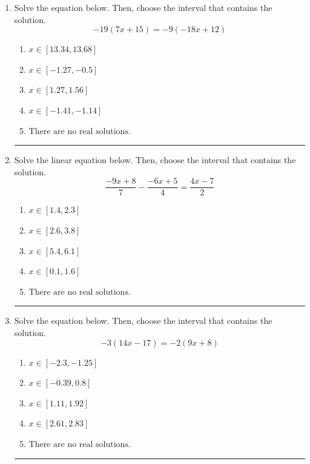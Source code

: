\documentclass[14pt]{extbook}
\newcommand{\litem}[1]{\item#1\hspace*{-1cm}\rule{\textwidth}{0.4pt}}
\begin{document}
\begin{enumerate}
\litem{
Solve the equation below. Then, choose the interval that contains the solution.\[ -19(7x + 15) = -9(-18x + 12) \]\begin{enumerate}[label=\Alph*.]
\item \( x \in [13.34, 13.68] \)
\item \( x \in [-1.27, -0.5] \)
\item \( x \in [1.27, 1.56] \)
\item \( x \in [-1.41, -1.14] \)
\item \( \text{There are no real solutions.} \)

\end{enumerate} }
\litem{
Solve the linear equation below. Then, choose the interval that contains the solution.\[ \frac{-9x + 8}{7} - \frac{-6x + 5}{4} = \frac{4x -7}{2} \]\begin{enumerate}[label=\Alph*.]
\item \( x \in [1.4, 2.3] \)
\item \( x \in [2.6, 3.8] \)
\item \( x \in [5.4, 6.1] \)
\item \( x \in [0.1, 1.6] \)
\item \( \text{There are no real solutions.} \)

\end{enumerate} }
\litem{
Solve the equation below. Then, choose the interval that contains the solution.\[ -3(14x -17) = -2(9x + 8) \]\begin{enumerate}[label=\Alph*.]
\item \( x \in [-2.3, -1.25] \)
\item \( x \in [-0.39, 0.8] \)
\item \( x \in [1.11, 1.92] \)
\item \( x \in [2.61, 2.83] \)
\item \( \text{There are no real solutions.} \)


\end{enumerate}}
\end{enumerate}
\end{document}
